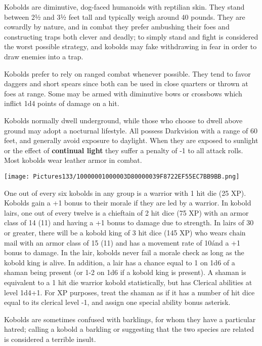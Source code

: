 \documentclass[a4paper,twoside,openany,10pt]{book}
\begin{document}
\begin{multicols}{2}
Kobolds are diminutive, dog-faced humanoids with reptilian skin. They stand between 2½ and 3½ feet tall and typically weigh around 40 pounds. They are cowardly by nature, and in combat they prefer ambushing their foes and constructing traps both clever and deadly; to simply stand and fight is considered the worst possible strategy, and kobolds may fake withdrawing in fear in order to draw enemies into a trap.

Kobolds prefer to rely on ranged combat whenever possible. They tend to favor daggers and short spears since both can be used in close quarters or thrown at foes at range. Some may be armed with diminutive bows or crossbows which inflict 1d4 points of damage on a hit. 

Kobolds normally dwell underground, while those who choose to dwell above ground may adopt a nocturnal lifestyle. All possess Darkvision with a range of 60 feet, and generally avoid exposure to daylight. When they are exposed to sunlight or the effect of \textbf{continual light }they suffer a penalty of -1 to all attack rolls. Most kobolds wear leather armor in combat.\\


\begin{center}
	 \texttt{[image: Pictures133/10000001000003D80000039F8722EF55EC7BB9BB.png]}
\end{center} \medskip

One out of every six kobolds in any group is a warrior with 1 hit die (25 XP). Kobolds gain a +1 bonus to their morale if they are led by a warrior. In kobold lairs, one out of every twelve is a chieftain of 2 hit dice (75 XP) with an armor class of 14 (11) and having a +1 bonus to damage due to strength. In lairs of 30 or greater, there will be a kobold king of 3 hit dice (145 XP) who wears chain mail with an armor class of 15 (11) and has a movement rate of 10\' and a +1 bonus to damage. In the lair, kobolds never fail a morale check as long as the kobold king is alive. In addition, a lair has a chance equal to 1 on 1d6 of a shaman being present (or 1-2 on 1d6 if a kobold king is present). A shaman is equivalent to a 1 hit die warrior kobold statistically, but has Clerical abilities at level 1d4+1. For XP purposes, treat the shaman as if it has a number of hit dice equal to its clerical level -1, and assign one special ability bonus asterisk.

Kobolds are sometimes confused with barklings, for whom they have a particular hatred; calling a kobold a barkling or suggesting that the two species are related is considered a terrible insult.



\end{multicols}
\end{document}
